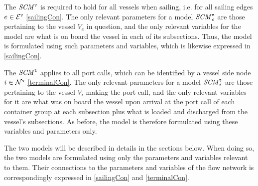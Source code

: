 The $\mathit{SCM}^\texttt{v}$ is required to hold for all vessels when sailing, i.e. for all sailing edges $e\in\mathcal{E}^\texttt{v}$ \eqref{sailingCon}. The only relevant parameters for a model $\mathit{SCM}^\texttt{v}_e$ are those pertaining to the vessel $V_e$ in question, and the only relevant variables for the model are what is on board the vessel in each of its subsections. Thus, the model is formulated using such parameters and variables, which is likewise expressed in \eqref{sailingCon}. 

The $\mathit{SCM}^\texttt{t}$ applies to all port calls, which can be identified by a vessel side node $i\in \mathcal{N}^\texttt{v}$ \eqref{terminalCon}. The only relevant parameters for a model $\mathit{SCM}^\texttt{t}_i$ are those pertaining to the vessel $V_i$ making the port call, and the only relevant variables for it are what was on board the vessel upon arrival at the port call of each container group at each subsection plus what is loaded and discharged from the vessel's subsections. As before, the model is therefore formulated using these variables and parameters only.    

The two models will be described in details in the sections below. When doing so, the two models are formulated using only the parameters and variables relevant to them. Their connections to the parameters and variables of the flow network is correspondingly expressed in \eqref{sailingCon} and \eqref{terminalCon}.

%

